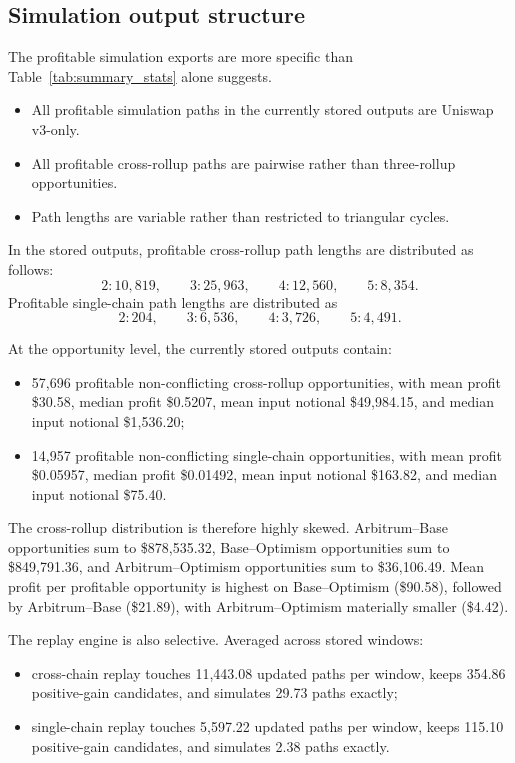 \documentclass[11pt]{article}
\begin{document}
\subsection{Simulation output structure}

The profitable simulation exports are more specific than Table~\ref{tab:summary_stats} alone suggests.
\begin{itemize}[leftmargin=1.5em]
    \item All profitable simulation paths in the currently stored outputs are Uniswap v3-only.
    \item All profitable cross-rollup paths are pairwise rather than three-rollup opportunities.
    \item Path lengths are variable rather than restricted to triangular cycles.
\end{itemize}

In the stored outputs, profitable cross-rollup path lengths are distributed as follows:
\[
2:10{,}819,\qquad 3:25{,}963,\qquad 4:12{,}560,\qquad 5:8{,}354.
\]
Profitable single-chain path lengths are distributed as
\[
2:204,\qquad 3:6{,}536,\qquad 4:3{,}726,\qquad 5:4{,}491.
\]

At the opportunity level, the currently stored outputs contain:
\begin{itemize}[leftmargin=1.5em]
    \item 57{,}696 profitable non-conflicting cross-rollup opportunities, with mean profit \$30.58, median profit \$0.5207, mean input notional \$49{,}984.15, and median input notional \$1{,}536.20;
    \item 14{,}957 profitable non-conflicting single-chain opportunities, with mean profit \$0.05957, median profit \$0.01492, mean input notional \$163.82, and median input notional \$75.40.
\end{itemize}

The cross-rollup distribution is therefore highly skewed. Arbitrum--Base opportunities sum to \$878{,}535.32, Base--Optimism opportunities sum to \$849{,}791.36, and Arbitrum--Optimism opportunities sum to \$36{,}106.49. Mean profit per profitable opportunity is highest on Base--Optimism (\$90.58), followed by Arbitrum--Base (\$21.89), with Arbitrum--Optimism materially smaller (\$4.42).

The replay engine is also selective. Averaged across stored windows:
\begin{itemize}[leftmargin=1.5em]
    \item cross-chain replay touches 11{,}443.08 updated paths per window, keeps 354.86 positive-gain candidates, and simulates 29.73 paths exactly;
    \item single-chain replay touches 5{,}597.22 updated paths per window, keeps 115.10 positive-gain candidates, and simulates 2.38 paths exactly.
\end{itemize}
\end{document}
